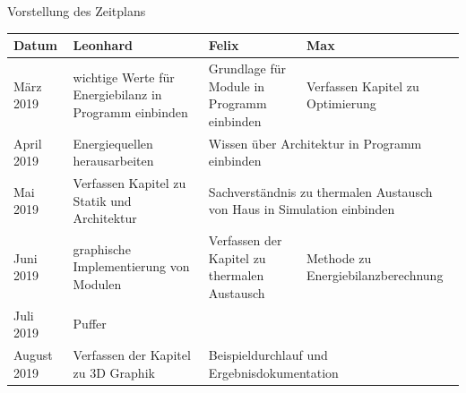 \documentclass[11pt]{beamer}
\begin{document}
\begin{frame}{Vorstellung des Zeitplans}
\begin{footnotesize}
\begin{tabular}{|p{2cm}||p{2.5cm}|p{2.5cm}|p{2.5cm}|} \hline
   Datum & Leonhard & Felix & Max \\ \hline \hline
   März 2019 & wichtige Werte für Energiebilanz in Programm einbinden & Grundlage für Module in Programm einbinden & Verfassen Kapitel zu Optimierung \\ \hline
   April 2019 & Energiequellen herausarbeiten & \multicolumn{2}{|p{5cm}|}{Wissen über Architektur in Programm einbinden} \\ \hline
   Mai 2019 & Verfassen Kapitel zu Statik und Architektur & \multicolumn{2}{|p{5cm}|}{Sachverständnis zu thermalen Austausch von Haus in Simulation einbinden} \\ \hline
   Juni 2019 &  graphische Implementierung von Modulen & Verfassen der Kapitel zu thermalen Austausch & Methode zu Energiebilanzberechnung \\ \hline
   Juli 2019 & \multicolumn{3}{|p{7.5cm}|}{Puffer} \\ \hline
   August 2019 & Verfassen der Kapitel zu 3D Graphik & \multicolumn{2}{|p{5cm}|}{Beispieldurchlauf und Ergebnisdokumentation} \\ \hline
\end{tabular}
\end{footnotesize}
\end{frame}
\end{document}
